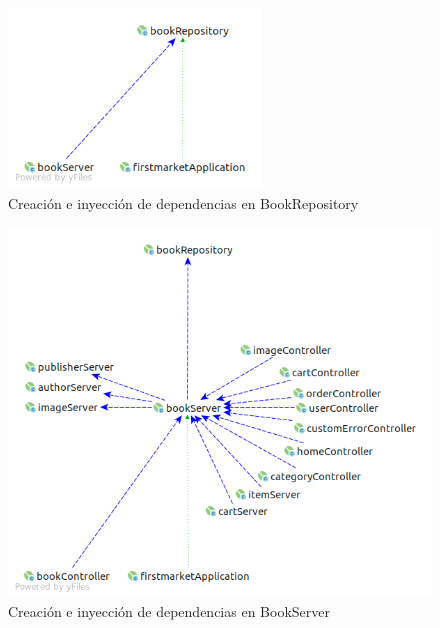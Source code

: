 \documentclass[a4paper]{article}
\begin{document}
	\begin{figure}[htb!]
		\centering
		\includegraphics[width=0.6\textwidth]{di_bookRepository}
		\caption{Creación e inyección de dependencias en BookRepository}
		\label{fig:di_bookRepository}
	\end{figure}

	\begin{figure}[htb!]
		\centering
		\includegraphics[width=\textwidth]{di_bookServer}
		\caption{Creación e inyección de dependencias en BookServer}
		\label{fig:di_bookServer}
	\end{figure}
\end{document}
